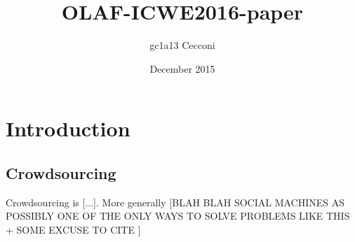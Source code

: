 \documentclass{llncs}
\title{OLAF-ICWE2016-paper}
\author{gc1a13 Cecconi}
\date{December 2015}
\begin{document}
\maketitle

\section{Introduction}

\subsection{Crowdsourcing}

Crowdsourcing is {[}...{]}. More generally {[}BLAH BLAH SOCIAL MACHINES AS POSSIBLY ONE OF THE ONLY WAYS TO SOLVE PROBLEMS LIKE THIS + SOME EXCUSE TO CITE \cite{OReilly:2015uo}{]}
\end{document}

